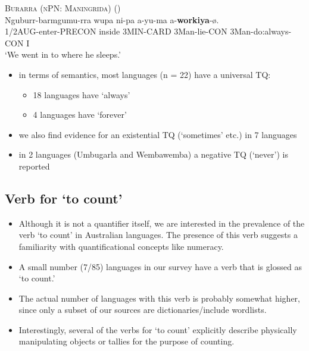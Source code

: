 \documentclass{article}
\makeatletter
\newcommand{\ofy}{/85} %
\makeatother
\begin{document}
\begin{exe}
  \ex\label{ex:valways} \textsc{Burarra (nPN: Maningrida)} (\citealt[87]{green87})\\
  \gll Nguburr-barmgumu-rra wupa ni-pa a-yu-ma a-\textbf{workiya}-ø.\\
  1/2AUG-enter-PRECON inside 3MIN-CARD  3Man-lie-CON 3Man-do:always-CON I\\
  \glt `We went in to where he sleeps.'
\end{exe}

\begin{itemize}
\item in terms of semantics, most languages (n = 22) have a universal TQ:
  \begin{itemize}
  \item 18 languages have `always'
  \item 4 languages have `forever'
  \end{itemize}
\item we also find evidence for an existential TQ (`sometimes' etc.) in 7 languages
\item in 2 languages (Umbugarla and Wembawemba) a negative TQ (`never') is reported
\end{itemize}



\subsection{Verb for `to count'}

\begin{itemize}
\item Although it is not a quantifier itself, we are interested in the prevalence of the verb `to count' in Australian languages. The presence of this verb suggests a familiarity with quantificational concepts like numeracy.
\item A small number (7\ofy) languages in our survey have a verb that is glossed as `to count.'

\item The actual number of languages with this verb is probably somewhat higher, since only a subset of our sources are dictionaries/include wordlists.
\item Interestingly, several of the verbs for `to count' explicitly describe physically manipulating objects or tallies for the purpose of counting.
\end{itemize}
\end{document}
